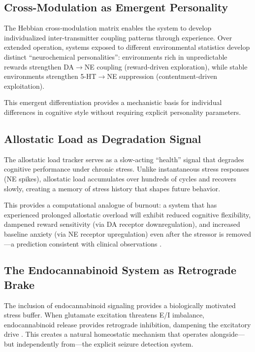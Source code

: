 \documentclass[11pt,a4paper]{article}
\begin{document}
\subsection{Cross-Modulation as Emergent Personality}

The Hebbian cross-modulation matrix enables the system to develop individualized inter-transmitter coupling patterns through experience. Over extended operation, systems exposed to different environmental statistics develop distinct ``neurochemical personalities'': environments rich in unpredictable rewards strengthen DA$\to$NE coupling (reward-driven exploration), while stable environments strengthen 5-HT$\to$NE suppression (contentment-driven exploitation).

This emergent differentiation provides a mechanistic basis for individual differences in cognitive style without requiring explicit personality parameters.

\subsection{Allostatic Load as Degradation Signal}

The allostatic load tracker serves as a slow-acting ``health'' signal that degrades cognitive performance under chronic stress. Unlike instantaneous stress responses (NE spikes), allostatic load accumulates over hundreds of cycles and recovers slowly, creating a memory of stress history that shapes future behavior.

This provides a computational analogue of burnout: a system that has experienced prolonged allostatic overload will exhibit reduced cognitive flexibility, dampened reward sensitivity (via DA receptor downregulation), and increased baseline anxiety (via NE receptor upregulation) even after the stressor is removed---a prediction consistent with clinical observations \citep{mcewen1998}.

\subsection{The Endocannabinoid System as Retrograde Brake}

The inclusion of endocannabinoid signaling provides a biologically motivated stress buffer. When glutamate excitation threatens E/I imbalance, endocannabinoid release provides retrograde inhibition, dampening the excitatory drive \citep{piomelli2003}. This creates a natural homeostatic mechanism that operates alongside---but independently from---the explicit seizure detection system.
\end{document}
